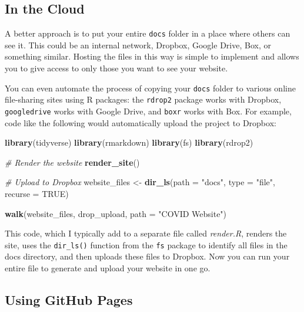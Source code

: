 \documentclass[
]{book}
\newenvironment{Shaded}{\begin{snugshade}}{\end{snugshade}}
\newcommand{\AttributeTok}[1]{\textcolor[rgb]{0.13,0.29,0.53}{#1}}
\newcommand{\CommentTok}[1]{\textcolor[rgb]{0.56,0.35,0.01}{\textit{#1}}}
\newcommand{\ConstantTok}[1]{\textcolor[rgb]{0.56,0.35,0.01}{#1}}
\newcommand{\FunctionTok}[1]{\textcolor[rgb]{0.13,0.29,0.53}{\textbf{#1}}}
\newcommand{\NormalTok}[1]{#1}
\newcommand{\OtherTok}[1]{\textcolor[rgb]{0.56,0.35,0.01}{#1}}
\newcommand{\StringTok}[1]{\textcolor[rgb]{0.31,0.60,0.02}{#1}}
\begin{document}
\hypertarget{in-the-cloud}{%
\subsection*{In the Cloud}\label{in-the-cloud}}

A better approach is to put your entire \texttt{docs} folder in a place where others can see it. This could be an internal network, Dropbox, Google Drive, Box, or something similar. Hosting the files in this way is simple to implement and allows you to give access to only those you want to see your website.

You can even automate the process of copying your \texttt{docs} folder to various online file-sharing sites using R packages: the \texttt{rdrop2} package works with Dropbox, \texttt{googledrive} works with Google Drive, and \texttt{boxr} works with Box. For example, code like the following would automatically upload the project to Dropbox:

\begin{Shaded}
\begin{Highlighting}[]
\FunctionTok{library}\NormalTok{(tidyverse)}
\FunctionTok{library}\NormalTok{(rmarkdown)}
\FunctionTok{library}\NormalTok{(fs)}
\FunctionTok{library}\NormalTok{(rdrop2)}

\CommentTok{\# Render the website}
\FunctionTok{render\_site}\NormalTok{()}

\CommentTok{\# Upload to Dropbox}
\NormalTok{website\_files }\OtherTok{\textless{}{-}} \FunctionTok{dir\_ls}\NormalTok{(}\AttributeTok{path =} \StringTok{"docs"}\NormalTok{,}
                        \AttributeTok{type =} \StringTok{"file"}\NormalTok{,}
                        \AttributeTok{recurse =} \ConstantTok{TRUE}\NormalTok{)}

\FunctionTok{walk}\NormalTok{(website\_files, drop\_upload, }\AttributeTok{path =} \StringTok{"COVID Website"}\NormalTok{)}
\end{Highlighting}
\end{Shaded}

This code, which I typically add to a separate file called \emph{render.R}, renders the site, uses the \texttt{dir\_ls()} function from the \texttt{fs} package to identify all files in the docs directory, and then uploads these files to Dropbox. Now you can run your entire file to generate and upload your website in one go.

\hypertarget{using-github-pages}{%
\subsection*{Using GitHub Pages}\label{using-github-pages}}
\end{document}
